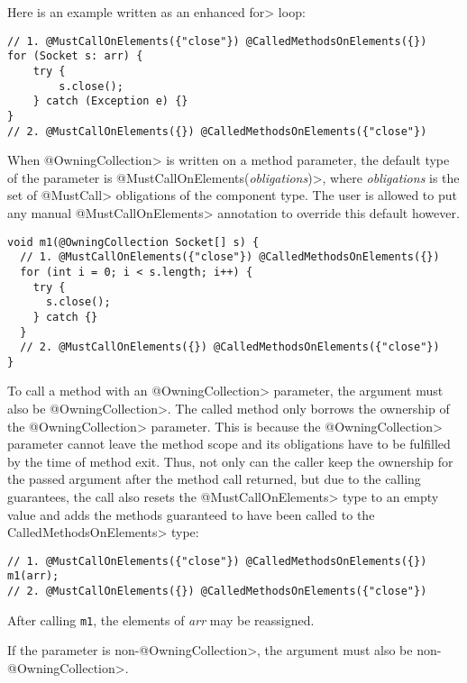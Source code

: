 Here is an example written as an enhanced \<for> loop:

\begin{verbatim}
// 1. @MustCallOnElements({"close"}) @CalledMethodsOnElements({})
for (Socket s: arr) {
    try {
        s.close();
    } catch (Exception e) {}
}
// 2. @MustCallOnElements({}) @CalledMethodsOnElements({"close"})
\end{verbatim}



When \<@OwningCollection> is written on a method parameter, the default type of the parameter is \<@MustCallOnElements(\textit{obligations})>, where \textit{obligations} is the set of \<@MustCall> obligations of the component type. The user is allowed to put any manual \<@MustCallOnElements> annotation to override this default however.

\begin{verbatim}
void m1(@OwningCollection Socket[] s) {
  // 1. @MustCallOnElements({"close"}) @CalledMethodsOnElements({})
  for (int i = 0; i < s.length; i++) {
    try {
      s.close();
    } catch {}
  }
  // 2. @MustCallOnElements({}) @CalledMethodsOnElements({"close"})
}
\end{verbatim}

To call a method with an \<@OwningCollection> parameter, the argument must also be \<@OwningCollection>. The called method only borrows the ownership of the \<@OwningCollection> parameter. This is because the \<@OwningCollection> parameter cannot leave the method scope and its obligations have to be fulfilled by the time of method exit. Thus, not only can the caller keep the ownership for the passed argument after the method call returned, but due to the calling guarantees, the call also resets the \<@MustCallOnElements> type to an empty value and adds the methods guaranteed to have been called to the \<CalledMethodsOnElements> type:

\begin{verbatim}
// 1. @MustCallOnElements({"close"}) @CalledMethodsOnElements({})
m1(arr);
// 2. @MustCallOnElements({}) @CalledMethodsOnElements({"close"})
\end{verbatim}

After calling \texttt{m1}, the elements of \textit{arr} may be reassigned.

If the parameter is non-\<@OwningCollection>, the argument must also be non-\<@OwningCollection>.

